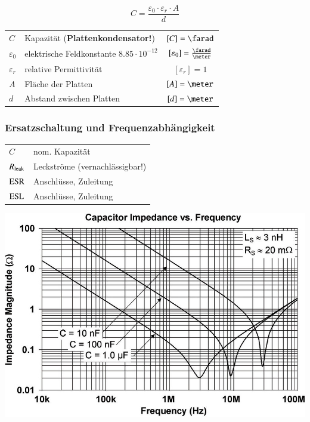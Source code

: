 \begin{minipage}[c]{0.20\columnwidth}
    $$ \boxed{C = \frac{\varepsilon_0 \cdot \varepsilon_r \cdot A}{d}} $$
\end{minipage}
\hfill
\begin{minipage}[c]{0.78\columnwidth}
    \begin{tabular}{llc}
        $C$             & Kapazität (\textbf{Plattenkondensator!})          & $[C] = \farad$ \\
        $\varepsilon_0$ & elektrische Feldkonstante $8.85 \cdot 10^{-12}$   & $[\varepsilon_0] = \frac{\farad}{\meter}$ \\
        $\varepsilon_r$ & relative Permittivität                            & $[\varepsilon_r] = 1$ \\
        $A$             & Fläche der Platten                                & $[A] = \meter$ \\
        $d$             & Abstand zwischen Platten                          & $[d] = \meter$
    \end{tabular}
\end{minipage}


\subsubsection{Ersatzschaltung und Frequenzabhängigkeit}

\begin{minipage}[c]{0.48\columnwidth}
    

    \begin{tabular}{ll@{}}
        $C$             & nom. Kapazität  \\
        $R_{\rm leak}$  & Leckströme (vernachlässigbar!) \\
        $\rm{ESR}$      & Anschlüsse, Zuleitung \\ 
        $\rm{ESL}$      & Anschlüsse, Zuleitung 
    \end{tabular}
\end{minipage}
\hfill
\begin{minipage}[c]{0.5\columnwidth}
    \includegraphics[width=\columnwidth]{images/realer_kondensator_frequenzverlauf.jpg}
\end{minipage}

